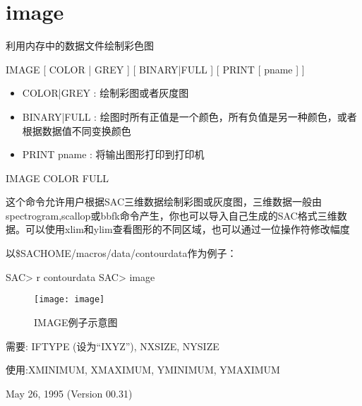 \section{image}
\label{cmd:image}

利用内存中的数据文件绘制彩色图

IMAGE [ COLOR | GREY ] [ BINARY|FULL ] [ PRINT [ pname ] ]

\begin{itemize}
\item COLOR|GREY :  绘制彩图或者灰度图
\item BINARY|FULL :  绘图时所有正值是一个颜色，所有负值是另一种颜色，或者根据数据值不同变换颜色 
\item PRINT pname : 将输出图形打印到打印机 
\end{itemize}

IMAGE COLOR FULL

这个命令允许用户根据SAC三维数据绘制彩图或灰度图，三维数据一般由spectrogram,scallop或bbfk命令产生，你也可以导入自己生成的SAC格式三维数据。可以使用xlim和ylim查看图形的不同区域，也可以通过一位操作符修改幅度

以\${SACHOME}/macros/data/contourdata作为例子：
\begin{SACCode}
SAC> r contourdata
SAC> image
\end{SACCode}

\begin{figure}[h]
\centering
\texttt{[image: image]}
\caption{IMAGE例子示意图}
\end{figure}

需要:  IFTYPE (设为``IXYZ''), NXSIZE, NYSIZE

使用:XMINIMUM, XMAXIMUM, YMINIMUM, YMAXIMUM

May 26, 1995 (Version 00.31)
